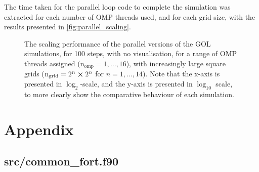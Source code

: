 \documentclass[]{article}
\begin{document}
The time taken for the parallel loop code to complete the simulation was
extracted for each number of OMP threads used, and for each grid size, with the
results presented in \autoref{fig:parallel_scaling}.


\begin{figure}[h]
  \centering
  \caption{The scaling performance of the parallel versions of the GOL
    simulations, for 100 steps, with no visualisation, for a range of OMP
    threads assigned ($\mathrm{n_{omp}} = 1, \dotsc, 16$), with increasingly
    large square grids ($\mathrm{n_{grid}} = 2^{n}\cross 2^{n}$ for
    $n = 1, \dotsc, 14$).
    Note that the x-axis is presented in $\log_{2}$-scale, and the y-axis is
    presented in $\log_{10}$ scale, to more clearly show the comparative
    behaviour of each simulation.
  }
  \label{fig:parallel_scaling}
\end{figure}

\newpage
\appendix
\section{Appendix}
\label{sec:appendix}

\subsection{src/common\_fort.f90}
\label{sec:common_fort}
\end{document}
